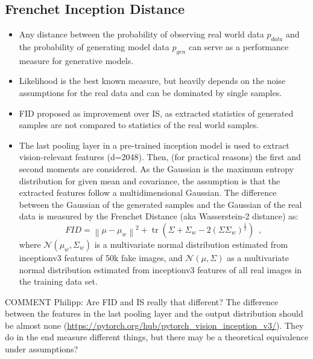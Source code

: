 \documentclass{article}
\begin{document}
\subsection{Frenchet Inception Distance}
\begin{itemize}
    \item Any distance between the probability of observing real world data $p_{data}$ and the probability of generating model data $p_{g e n}$ can serve as a performance measure for generative models.
    \item Likelihood is the best known measure, but heavily depends on the noise assumptions for the real data and can be dominated by single samples.
    \item FID proposed as improvement over IS, as extracted statistics of generated samples are not compared to statistics of the real world samples.
    \item The last pooling layer in a pre-trained inception model is used to extract vision-relevant features (d=2048). Then, (for practical reasons) the first and second moments are considered. As the Gaussian is the maximum entropy distribution for given mean and covariance, the assumption is that the extracted features follow a multidimensional Gaussian. The difference between the Gaussian of the generated samples and the Gaussian of the real data is measured by the Frenchet Distance (aka Wasserstein-2 distance) as:
    $$
  F I D=\left\|\mu-\mu_w\right\|^2+\operatorname{tr}\left(\Sigma+\Sigma_w-2\left(\Sigma \Sigma_w\right)^{\frac{1}{2}}\right)\enspace,
  $$
  where $\mathcal{N}\left(\mu_w, \Sigma_w\right)$ is a multivariate normal distribution estimated from inceptionv3 features of 50k fake images, and $\mathcal{N}\left(\mu, \Sigma\right)$ as a multivariate normal distribution estimated from inceptionv3 features of all real images in the training data set.
\end{itemize}
  
COMMENT Philipp: Are FID and IS really that different? The difference between the features in the last pooling layer and the output distribution should be almost none (\url{https://pytorch.org/hub/pytorch_vision_inception_v3/}). They do in the end measure different things, but there may be a theoretical equivalence under assumptions?
\end{document}
